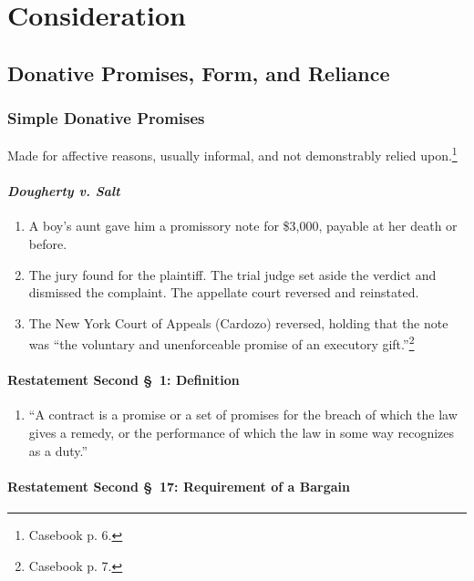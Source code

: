 \section{Consideration}

\subsection{Donative Promises, Form, and Reliance}

\subsubsection{Simple Donative Promises}

Made for affective reasons, usually informal, and not demonstrably relied 
upon.\footnote{Casebook p. 6.}

\paragraph{\emph{Dougherty v. Salt}}

\begin{enumerate}
    \item A boy's aunt gave him a promissory note for \$3,000, payable at her 
    death or before.
    \item The jury found for the plaintiff. The trial judge set aside the 
    verdict and dismissed the complaint. The appellate court reversed and 
    reinstated.
    \item The New York Court of Appeals (Cardozo) reversed, holding that the 
    note was ``the voluntary and unenforceable promise of an executory 
    gift.''\footnote{Casebook p. 7.}
\end{enumerate}

\paragraph{Restatement Second \S\ 1: Definition}

\begin{enumerate}
    \item ``A contract is a promise or a set of promises for the breach of 
    which the law gives a remedy, or the performance of which the law in some 
    way recognizes as a duty.''
\end{enumerate}

\paragraph{Restatement Second \S\ 17: Requirement of a Bargain}

